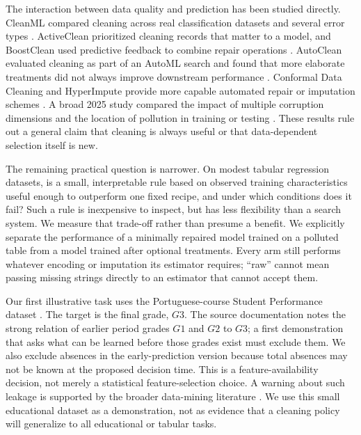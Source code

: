 \documentclass[conference]{IEEEtran}
\begin{document}
The interaction between data quality and prediction has been studied directly. CleanML compared cleaning across real classification datasets and several error types \cite{Li2021}. ActiveClean prioritized cleaning records that matter to a model, and BoostClean used predictive feedback to combine repair operations \cite{Krishnan2016,Krishnan2017}. AutoClean evaluated cleaning as part of an AutoML search and found that more elaborate treatments did not always improve downstream performance \cite{Neutatz2022}. Conformal Data Cleaning and HyperImpute provide more capable automated repair or imputation schemes \cite{Jger2024,Jarrett2022}. A broad 2025 study compared the impact of multiple corruption dimensions and the location of pollution in training or testing \cite{Mohammed2025}. These results rule out a general claim that cleaning is always useful or that data-dependent selection itself is new.

The remaining practical question is narrower. On modest tabular regression datasets, is a small, interpretable rule based on observed training characteristics useful enough to outperform one fixed recipe, and under which conditions does it fail? Such a rule is inexpensive to inspect, but has less flexibility than a search system. We measure that trade-off rather than presume a benefit. We explicitly separate the performance of a minimally repaired model trained on a polluted table from a model trained after optional treatments. Every arm still performs whatever encoding or imputation its estimator requires; ``raw'' cannot mean passing missing strings directly to an estimator that cannot accept them.

Our first illustrative task uses the Portuguese-course Student Performance dataset \cite{Cortez2008,Cortez2014}. The target is the final grade, $G3$. The source documentation notes the strong relation of earlier period grades $G1$ and $G2$ to $G3$; a first demonstration that asks what can be learned before those grades exist must exclude them. We also exclude absences in the early-prediction version because total absences may not be known at the proposed decision time. This is a feature-availability decision, not merely a statistical feature-selection choice. A warning about such leakage is supported by the broader data-mining literature \cite{Kaufman2012}. We use this small educational dataset as a demonstration, not as evidence that a cleaning policy will generalize to all educational or tabular tasks.
\end{document}
